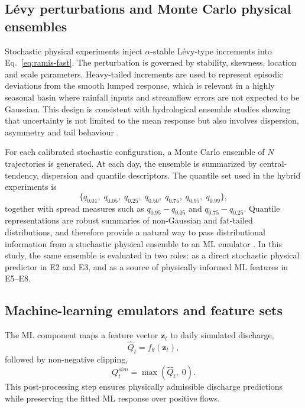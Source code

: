 \documentclass[a4paper,fleqn]{cas-sc}
\begin{document}
\subsection{L\'{e}vy perturbations and Monte Carlo physical ensembles}
\label{subsec:levy}

Stochastic physical experiments inject $\alpha$-stable L\'{e}vy-type
increments into Eq.~\ref{eq:ramis-fast}. The perturbation is governed
by stability, skewness, location and scale parameters. Heavy-tailed
increments are used to represent episodic deviations from the smooth
lumped response, which is relevant in a highly seasonal basin where
rainfall inputs and streamflow errors are not expected to be Gaussian.
This design is consistent with hydrological ensemble studies showing
that uncertainty is not limited to the mean response but also involves
dispersion, asymmetry and tail behaviour
\citep{hong2006uncertainty,gabellani2007propagation,abaza2017incidence}.

For each calibrated stochastic configuration, a Monte Carlo ensemble of
$N$ trajectories is generated. At each day, the ensemble is summarized
by central-tendency, dispersion and quantile descriptors. The quantile
set used in the hybrid experiments is
\begin{equation}
\{q_{0.01},\;q_{0.05},\;q_{0.25},\;q_{0.50},\;q_{0.75},
  \;q_{0.95},\;q_{0.99}\},
\label{eq:quantiles}
\end{equation}
together with spread measures such as $q_{0.95}-q_{0.05}$ and
$q_{0.75}-q_{0.25}$. Quantile representations are robust summaries of
non-Gaussian and fat-tailed distributions, and therefore provide a
natural way to pass distributional information from a stochastic
physical ensemble to an ML emulator \citep{swiderski2016aggregation}.
In this study, the same ensemble is evaluated in two roles: as a direct
stochastic physical predictor in E2 and E3, and as a source of
physically informed ML features in E5--E8.

\subsection{Machine-learning emulators and feature sets}
\label{subsec:emulator}

The ML component maps a feature vector $\mathbf{z}_t$ to daily simulated
discharge,
\begin{equation}
\hat{Q}_t = f_\theta(\mathbf{z}_t),
\label{eq:emulator}
\end{equation}
followed by non-negative clipping,
\begin{equation}
Q^{sim}_t = \max(\hat{Q}_t,\;0).
\label{eq:ml-clipping}
\end{equation}
This post-processing step ensures physically admissible discharge
predictions while preserving the fitted ML response over positive
flows.
\end{document}

